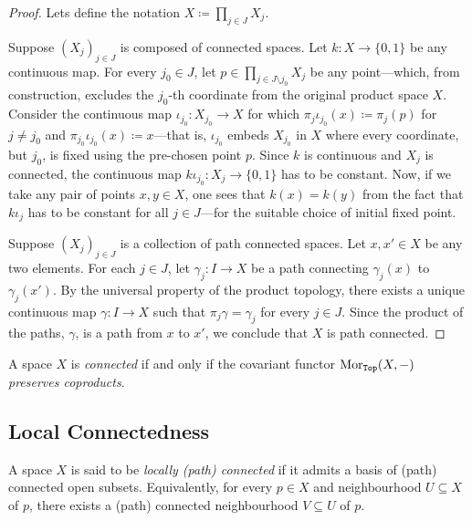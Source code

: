 \begin{proof}
    Lets define the notation \(X \coloneq \prod_{j \in J} X_j\).

    Suppose \((X_j)_{j \in J}\) is composed of connected spaces. Let
    \(k: X \to \{0, 1\}\) be any continuous map. For every \(j_0 \in J\), let
    \(p \in \prod_{j \in J \setminus j_0} X_j\) be any point---which, from
    construction, excludes the \(j_0\)-th coordinate from the original product space
    \(X\). Consider the continuous map \(\iota_{j_0}: X_{j_0} \to X\) for which
    \(\pi_j \iota_{j_0}(x) \coloneq \pi_j(p)\) for \(j \neq j_0\) and
    \(\pi_{j_0}\iota_{j_0}(x) \coloneq x\)---that is, \(\iota_{j_0}\) embeds
    \(X_{j_0}\) in \(X\) where every coordinate, but \(j_0\), is fixed using the
    pre-chosen point \(p\). Since \(k\) is continuous and \(X_j\) is connected, the
    continuous map \(k \iota_{j_0}: X_j \to \{0, 1\}\) has to be constant. Now, if
    we take any pair of points \(x, y \in X\), one sees that \(k(x) = k(y)\) from
    the fact that \(k \iota_j\) has to be constant for all \(j \in J\)---for the
    suitable choice of initial fixed point.

    Suppose \((X_j)_{j \in J}\) is a collection of path connected spaces. Let
    \(x, x' \in X\) be any two elements. For each \(j \in J\), let
    \(\gamma_j: I \to X\) be a path connecting \(\gamma_j(x)\) to
    \(\gamma_j(x')\). By the universal property of the product topology, there
    exists a unique continuous map \(\gamma: I \to X\) such that
    \(\pi_j \gamma = \gamma_j\) for every \(j \in J\). Since the product of the
    paths, \(\gamma\), is a path from \(x\) to \(x'\), we conclude that \(X\) is
    path connected.
\end{proof}

\begin{theorem}
    \label{thm:connected-iff-cov-preserves-coprod}
    A space \(X\) is \emph{connected} if and only if the covariant functor
    \(\operatorname{Mor}_{{\texttt{Top}}}(X, -)\) \emph{preserves coproducts}.
\end{theorem}


\subsection{Local Connectedness}

\begin{definition}
    \label{def:local-connected}
    A space \(X\) is said to be \emph{locally (path) connected} if it admits a basis
    of (path) connected open subsets. Equivalently, for every \(p \in X\) and
    neighbourhood \(U \subseteq X\) of \(p\), there exists a (path) connected
    neighbourhood \(V \subseteq U\) of \(p\).
\end{definition}

